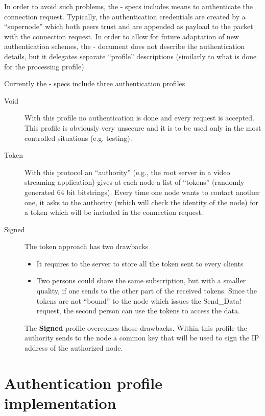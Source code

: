 \documentclass[a4paper]{medusabook}
\begin{document}
In order to avoid such problems, the \ppetp- specs includes means to
authenticate the connection request.  Typically, the authentication
credentials are created by a ``supernode'' which both peers trust and
are appended as payload to the packet with the connection request. 
In order to allow for future adaptation of new authentication schemes,
the \ppetp- document does not describe the authentication details, but
it delegates separate ``profile'' descriptions (similarly to what is
done for the processing profile).

Currently the \ppetp- specs include three authentication profiles

\begin{description}
  \item[Void] With this profile no authentication is done and every
  request is accepted.  This profile is obviously very unsecure and it
  is to be used only in the most controlled
  situations (e.g. testing).
  \item[Token] With this protocol an ``authority'' (e.g., the root
  server in a video streaming application) gives at each node a list
  of ``tokens'' (randomly generated 64 bit bitstrings).  Every time
  one node wants to contact another one, it asks to the authority
  (which will check the identity of the node) for a token which will be
  included in the connection request.  
  \item[Signed] The token approach has two drawbacks
    \begin{itemize}
      \item
        It requires to the server to store all the token sent to every
        clients 
      \item
        Two persons could share the same subscription, but with a
        smaller quality, if one sends to the other part of the
        received tokens.  Since the tokens are not ``bound'' to the
        node which issues the \ttt Send_Data! request, the second
        person can use the tokens to access the data.
    \end{itemize}
   The \textbf{Signed} profile overcomes those drawbacks.  Within this
   profile the authority sends to the node a common key that will be
   used to sign the IP address of the authorized node.
\end{description}

\section{Authentication profile implementation}
\label{sect:1.1;overview}
\end{document}
